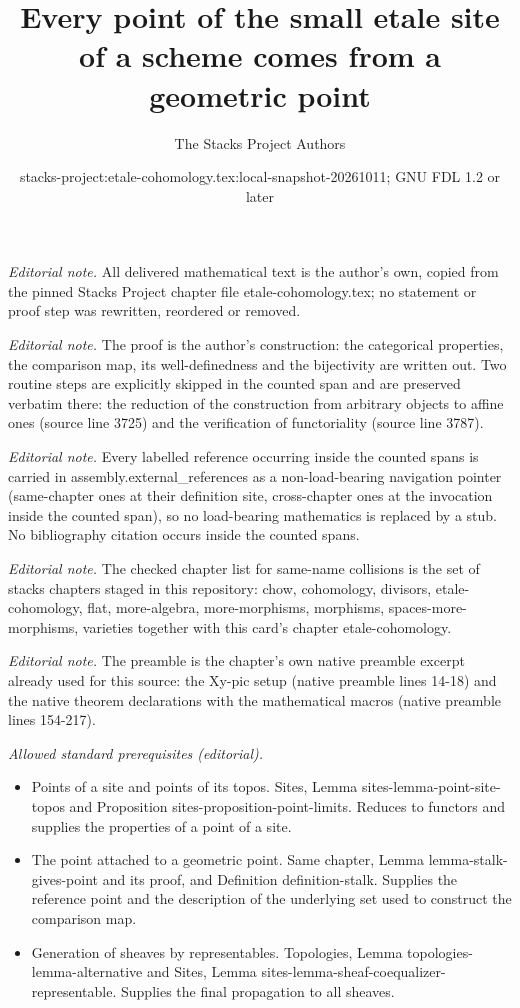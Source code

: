 \documentclass[10pt,a4paper]{amsart}
\title{Every point of the small etale site of a scheme comes from a geometric point}
\author{The Stacks Project Authors}
\date{stacks-project:etale-cohomology.tex:local-snapshot-20261011; GNU FDL 1.2 or later}
\theoremstyle{plain}
\theoremstyle{definition}
\theoremstyle{remark}
\numberwithin{equation}{subsection}
\begin{document}
\maketitle
\noindent\textit{Editorial note.} All delivered mathematical text is the author's own, copied from the pinned Stacks Project chapter file etale-cohomology.tex; no statement or proof step was rewritten, reordered or removed.\par\medskip
\noindent\textit{Editorial note.} The proof is the author's construction: the categorical properties, the comparison map, its well-definedness and the bijectivity are written out. Two routine steps are explicitly skipped in the counted span and are preserved verbatim there: the reduction of the construction from arbitrary objects to affine ones (source line 3725) and the verification of functoriality (source line 3787).\par\medskip
\noindent\textit{Editorial note.} Every labelled reference occurring inside the counted spans is carried in assembly.external\_references as a non-load-bearing navigation pointer (same-chapter ones at their definition site, cross-chapter ones at the invocation inside the counted span), so no load-bearing mathematics is replaced by a stub. No bibliography citation occurs inside the counted spans.\par\medskip
\noindent\textit{Editorial note.} The checked chapter list for same-name collisions is the set of stacks chapters staged in this repository: chow, cohomology, divisors, etale-cohomology, flat, more-algebra, more-morphisms, morphisms, spaces-more-morphisms, varieties together with this card's chapter etale-cohomology.\par\medskip
\noindent\textit{Editorial note.} The preamble is the chapter's own native preamble excerpt already used for this source: the Xy-pic setup (native preamble lines 14-18) and the native theorem declarations with the mathematical macros (native preamble lines 154-217).\par\medskip
\noindent\textit{Allowed standard prerequisites (editorial).}\begin{itemize}
\item Points of a site and points of its topos. Sites, Lemma sites-lemma-point-site-topos and Proposition sites-proposition-point-limits. Reduces to functors and supplies the properties of a point of a site.
\item The point attached to a geometric point. Same chapter, Lemma lemma-stalk-gives-point and its proof, and Definition definition-stalk. Supplies the reference point and the description of the underlying set used to construct the comparison map.
\item Generation of sheaves by representables. Topologies, Lemma topologies-lemma-alternative and Sites, Lemma sites-lemma-sheaf-coequalizer-representable. Supplies the final propagation to all sheaves.
\end{itemize}\medskip
\end{document}

